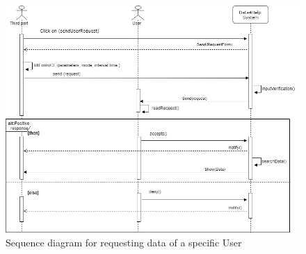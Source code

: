 \begin{figure}[H]
    \centering
    \includegraphics[scale=0.4]{./Pictures/request1.png}
    \caption{Sequence diagram for requesting data of a specific User}
  
\end{figure}